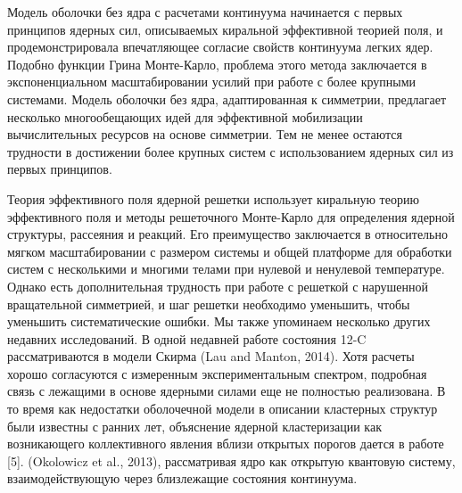 \documentclass[fontsize=14pt]{scrarticle}
\begin{document}
Модель оболочки без ядра с расчетами континуума начинается с первых принципов ядерных сил, описываемых киральной эффективной теорией поля, и продемонстрировала впечатляющее согласие свойств континуума легких ядер. Подобно функции Грина Монте-Карло, проблема этого метода заключается в экспоненциальном масштабировании усилий при работе с более крупными системами. Модель оболочки без ядра, адаптированная к симметрии, предлагает несколько многообещающих идей для эффективной мобилизации вычислительных ресурсов на основе симметрии. Тем не менее остаются трудности в достижении более крупных систем с использованием ядерных сил из первых принципов.

Теория эффективного поля ядерной решетки использует киральную теорию эффективного поля и методы решеточного Монте-Карло для определения ядерной структуры, рассеяния и реакций. Его преимущество заключается в относительно мягком масштабировании с размером системы и общей платформе для обработки систем с несколькими и многими телами при нулевой и ненулевой температуре. Однако есть дополнительная трудность при работе с решеткой с нарушенной вращательной симметрией, и шаг решетки необходимо уменьшить, чтобы уменьшить систематические ошибки.
Мы также упоминаем несколько других недавних исследований. В одной недавней работе состояния 12-C рассматриваются в модели Скирма (Lau and Manton, 2014). Хотя расчеты хорошо согласуются с измеренным экспериментальным спектром, подробная связь с лежащими в основе ядерными силами еще не полностью реализована. В то время как недостатки оболочечной модели в описании кластерных структур были известны с ранних лет, объяснение ядерной кластеризации как возникающего коллективного явления вблизи открытых порогов дается в работе [5]. (Okolowicz et al., 2013), рассматривая ядро как открытую квантовую систему, взаимодействующую через близлежащие состояния континуума.
\end{document}
